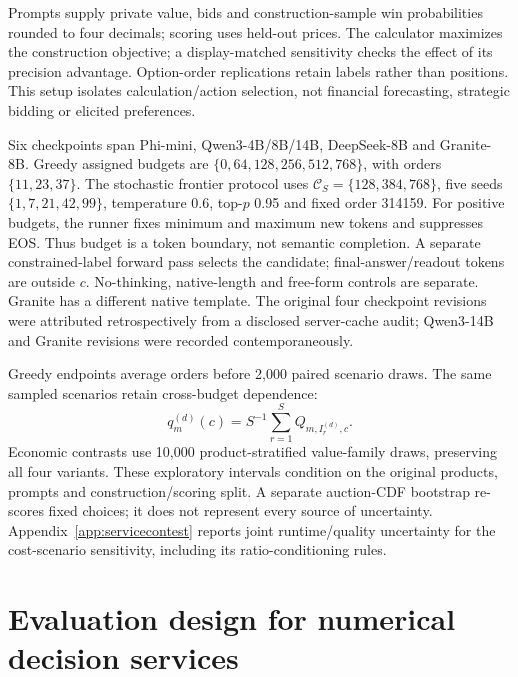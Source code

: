 \documentclass[sigconf,anonymous,nonacm]{acmart}
\begin{document}
Prompts supply private value, bids and construction-sample win probabilities rounded to four decimals; scoring uses held-out prices. The calculator maximizes the construction objective; a display-matched sensitivity checks the effect of its precision advantage. Option-order replications retain labels rather than positions. This setup isolates calculation/action selection, not financial forecasting, strategic bidding or elicited preferences.

Six checkpoints span Phi-mini, Qwen3-4B/8B/14B, DeepSeek-8B and Granite-8B. Greedy assigned budgets are $\{0,\allowbreak64,\allowbreak128,\allowbreak256,\allowbreak512,\allowbreak768\}$, with orders $\{11,23,37\}$. The stochastic frontier protocol uses $\mathcal C_S=\{128,\allowbreak384,\allowbreak768\}$, five seeds $\{1,7,21,42,99\}$, temperature 0.6, top-$p$ 0.95 and fixed order 314159. For positive budgets, the runner fixes minimum and maximum new tokens and suppresses EOS. Thus budget is a token boundary, not semantic completion. A separate constrained-label forward pass selects the candidate; final-answer/readout tokens are outside $c$. No-thinking, native-length and free-form controls are separate. Granite has a different native template. The original four checkpoint revisions were attributed retrospectively from a disclosed server-cache audit; Qwen3-14B and Granite revisions were recorded contemporaneously.

Greedy endpoints average orders before 2,000 paired scenario draws. The same sampled scenarios retain cross-budget dependence:
\begin{equation}
q_m^{(d)}(c)=S^{-1}\sum_{r=1}^S Q_{m,I_r^{(d)},c}.
\label{eq:bootstrapfrontier}\end{equation}
Economic contrasts use 10,000 product-stratified value-family draws, preserving all four variants. These exploratory intervals condition on the original products, prompts and construction/scoring split. A separate auction-CDF bootstrap re-scores fixed choices; it does not represent every source of uncertainty. Appendix~\ref{app:servicecontest} reports joint runtime/quality uncertainty for the cost-scenario sensitivity, including its ratio-conditioning rules.

\section{Evaluation design for numerical decision services}\label{sec:evaluation}
\end{document}
